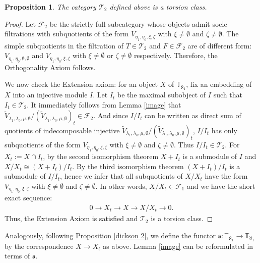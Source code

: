 \documentclass[openany, a4paper]{amsbook}
\newtheorem{prop}[thm]{Proposition}
\theoremstyle{definition}
\numberwithin{equation}{chapter}
\newcommand{\T}[1]{{\mathbb{T}}_{\aleph_{#1}}}
\begin{document}
\begin{prop}
    The category $\mathcal{T}_2$ defined above is a torsion class. 
\end{prop}

\begin{proof}
    Let $\mathcal{F}_2$ be the strictly full subcategory whose objects admit socle filtrations with subquotients of the form $V_{\eta_1, \eta_0, \xi, \zeta}$ with $\xi \neq \emptyset$ and $\zeta \neq \emptyset$. 
    The simple subquotients in the filtration of $T \in \mathcal{T}_2$ and $F \in \mathcal{F}_2$ are of different form: $V_{\eta_1, \eta_0, \emptyset, \emptyset}$ and $V_{\eta_1, \eta_0, \xi, \zeta}$ with $\xi \neq \emptyset$ or  $\zeta \neq \emptyset$ respectively. Therefore, the Orthogonality Axiom follows.

    We now check the Extension axiom: for an object $X$ of $\T{1}$, fix an embedding of $X$ into an injective module $I$. Let $I_t$ be the maximal subobject of $I$ such that $I_t \in \mathcal{T}_2$. It immediately follows from Lemma \ref*{image} that $\tilde{V}_{\lambda_1, \lambda_0, \mu, \emptyset}/ (\tilde{V}_{\lambda_1, \lambda_0, \mu, \emptyset})_t \in \mathcal{F}_2$. And since $I/I_t$ can be written as direct sum of quotients of indecomposable injective $\tilde{V}_{\lambda_1, \lambda_0, \mu, \emptyset}/ (\tilde{V}_{\lambda_1, \lambda_0, \mu, \emptyset})_t$, $I/I_t$ has only subquotients of the form $V_{\eta_1, \eta_0, \xi, \zeta}$ with $\xi \neq \emptyset$ and $\zeta \neq \emptyset$. Thus $I/I_t \in \mathcal{T}_2$. For $X_t := X \cap I_t$, by the second isomorphism theorem $X+I_t$ is a submodule of $I$ and $X/X_t \cong (X+I_t)/I_t$. By the third isomorphism theorem $(X+I_t)/I_t$ is a submodule of $I/I_t$, hence we infer that all subquotients of $X/X_t$ have the form $V_{\eta_1, \eta_0, \xi, \zeta}$ with $\xi \neq \emptyset$ and $\zeta \neq \emptyset$. In other words, $X/X_t \in \mathcal{F}_1$ and we have the short exact sequence: 
    \begin{align*}
        0 \to X_t \to X \to X/X_t \to 0.
    \end{align*}
    Thus, the Extension Axiom is satisfied and $\mathcal{T}_2$ is a torsion class.
\end{proof}

Analogously, following Proposition \ref{dickson 2}, we define the functor $\mathfrak{s}: \T{1} \to \T{1}$ by the correspondence $X \to X_t$ as above. Lemma \ref*{image} can be reformulated in terms of $\mathfrak{s}$.
\end{document}
